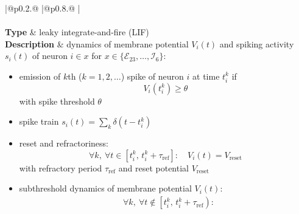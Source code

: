 \documentclass[10pt,a4paper,twoside,american]{article}
\theoremstyle{definitionstyle}
\newcommand{\tauR}{\tau_\text{ref}}
\begin{document}
\begin{table}[H]
\renewcommand{\arraystretch}{1.2}
\begin{tabular}{
  |@{\hspace*{\marg}}p{}@{\hspace*{\marg}}
  |@{\hspace*{\marg}}p{}@{\hspace*{\marg}}
  |}
  \hline 
  \\
  \hline
  \\
  \hline
  \textbf{Type} & leaky integrate-and-fire (LIF)\\
  \hline 
  \textbf{Description} & dynamics of membrane potential $V_{i}(t)$ and spiking activity $s_i(t)$ of neuron $i\in x$ for $x\in\{\mathcal{E}_{23},\ldots,\mathcal{I}_{6}\}$:
                         \begin{itemize}
                         \item emission of $k$th ($k=1,2,\ldots$) spike of neuron $i$ at time $t_{i}^{k}$ if
                           \begin{equation}
                             V_{i}\left(t_{i}^{k}\right)\geq\theta  
                           \end{equation}
                           with spike threshold $\theta$
                         \item spike train $\displaystyle s_i(t)=\sum_k \delta(t-t_i^k)$                           
                         \item reset and refractoriness:
                           \begin{equation}
				   \forall{}k,\ \forall t \in \left[t_{i}^{k},\,t_{i}^{k}+\tauR\right]:\quad V_{i}(t)=V_\text{reset}  
                           \end{equation}
                            with refractory period $\tauR$ and reset potential $V_\text{reset}$
                         \item subthreshold dynamics of membrane potential $V_{i}(t)$:
                           \begin{equation}
			     \label{eq:membrane_potential}
                             \begin{aligned}
                               &\forall{}k,\ \forall t \notin \left[t_{i}^{k},\,t_{i}^{k}+\tauR\right):\\

\end{aligned}
\end{equation}
\end{itemize}
\end{tabular}
\end{table}
\end{document}
